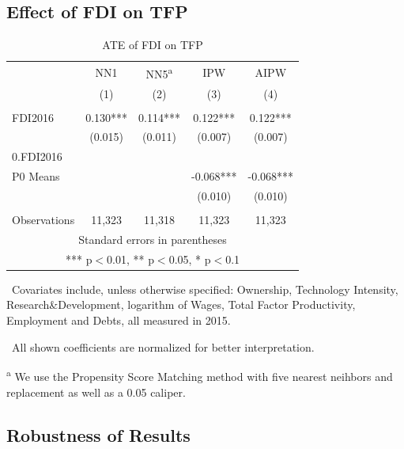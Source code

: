 \documentclass[a4paper,11pt]{scrartcl}
\begin{document}
\subsection{Effect of FDI on TFP}
\begin{table}
 \centering
   \caption{ATE of FDI on TFP}
\begin{tabular}{lcccc} \hline
 & NN1 & NN5\textsuperscript{a} & IPW & AIPW \\
 & (1) & (2) & (3)  & (4) \\ \hline
 &  &  &  &    \\
FDI2016 & 0.130*** & 0.114*** & 0.122***  & 0.122***   \\
 & (0.015) & (0.011) & (0.007) &   (0.007)  \\
0.FDI2016 &  &  &  &    \\
P0 Means & & & -0.068*** & -0.068***\\
&  &  & (0.010)  &  (0.010) \\
&  &  &  &    \\
 Observations & 11,323 & 11,318 & 11,323 & 11,323 \\ \hline
\multicolumn{5}{c}{ Standard errors in parentheses} \\
\multicolumn{5}{c}{ *** p$<$0.01, ** p$<$0.05, * p$<$0.1} \\
\end{tabular}
\begin{tablenotes}
      \tiny
	\item\ Covariates include, unless otherwise specified: Ownership, Technology Intensity, Research\&Development, logarithm of Wages, Total Factor Productivity, Employment and Debts, all measured in 2015. 
	\item\ All shown coefficients are normalized for better interpretation. 
	\item\textsuperscript{a} We use the Propensity Score Matching method with five nearest neihbors and replacement as well as a 0.05 caliper. 
\end{tablenotes}
\end{table}



\subsection{Robustness of Results}
\end{document}
